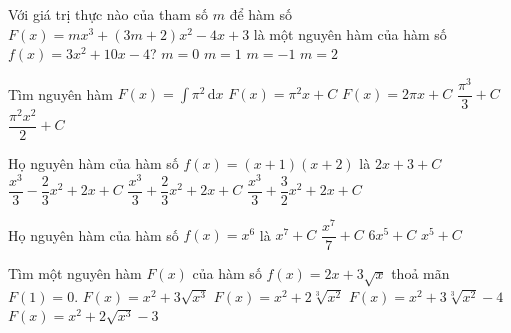 \begin{ex}%
	Với giá trị thực nào của tham số $m$ để hàm số $F(x)=m x^3+(3m+2) x^2-4x+3$ là một  nguyên hàm của hàm số $f(x)=3x^2+10x-4$?
	\choice 
		{$m=0$} 
		{\True  $m=1$}
		{$m=-1$} 
		{$m=2$} 
\end{ex}

\begin{ex}%
	Tìm nguyên hàm $F(x)=\displaystyle\int  \pi^2\mathrm{\,d}x$
	\choice 
		{\True $F(x)=\pi^2x+C$} 
		{$F(x)=2\pi x+C$} 
		 {$\dfrac{\pi^3}{3}+C$}
		 {$\dfrac{\pi^2x^2}{2}+C$}
\end{ex}

\begin{ex}%
	Họ  nguyên hàm của hàm số $f(x)=(x+1)(x+2)$ là
	\choice 
		 {$2x+3+C$}
		{$\dfrac{x^3}{3}-\dfrac{2}{3} x^2+2x+C$} 
		{$\dfrac{x^3}{3}+\dfrac{2}{3} x^2+2x+C$} 
		{\True $\dfrac{x^3}{3}+\dfrac{3}{2}  x^2+2x+C$}
\end{ex}

\begin{ex}%
	 Họ nguyên hàm của hàm số $f(x)=x^6$ là
	 \choice
		 {$x^7+C$}
		{\True $\dfrac{x^7}{7}+C$} 
		 {$6x^5+C$}
		 {$x^5+C$}
\end{ex}

\begin{ex}%
	 Tìm một nguyên hàm $F(x)$ của hàm số $f(x)=2x+3\sqrt{x}$ thoả mãn $F(1)=0$.
	\choice 
		 {$F(x)=x^2+3\sqrt{x^3}$}
		 {$F(x)=x^2+2\sqrt[3]{x^2}$}
		{$F(x)=x^2+3\sqrt[3]{x^2}-4$} 
		{\True  $F(x)=x^2+2\sqrt{x^3}-3$}
\end{ex}

